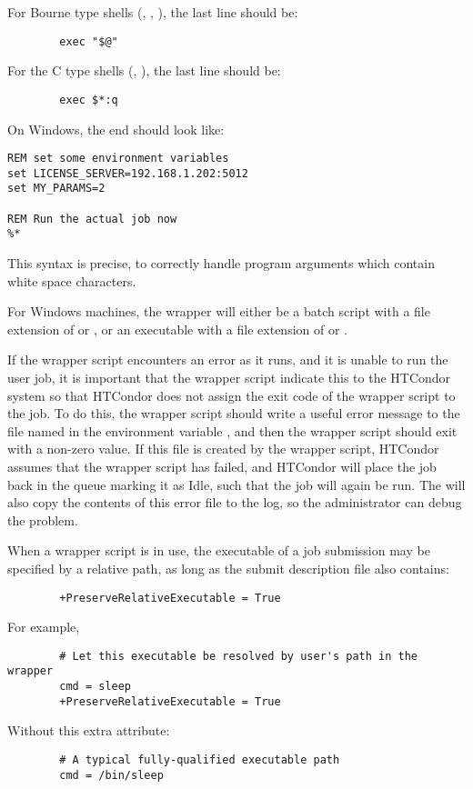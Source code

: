 \begin{description}
  For Bourne type shells (, , ), 
  the last line should be:
\begin{verbatim}
        exec "$@"
\end{verbatim}
  For the C type shells (, ), the last line should be:
\begin{verbatim}
        exec $*:q
\end{verbatim}

  On Windows, the end should look like:
\begin{verbatim}
REM set some environment variables
set LICENSE_SERVER=192.168.1.202:5012
set MY_PARAMS=2

REM Run the actual job now
%*

\end{verbatim}

  This syntax is precise, to correctly handle program arguments
  which contain white space characters.

  For Windows machines, the wrapper will either be
  a batch script with a file extension of  or ,
  or an executable with a file extension of  or .

  If the wrapper script encounters an error as it runs,
  and it is unable to run the user job, 
  it is important that the wrapper script indicate this to the HTCondor system
  so that HTCondor does not assign the exit code of the wrapper script to the
  job.  
  To do this, the wrapper script should write a useful error message
  to the file named in the environment variable 
  ,
  and then the wrapper script should exit with a non-zero value.
  If this file is created by the wrapper script, 
  HTCondor assumes that the wrapper script has failed, 
  and HTCondor will place the job back in the queue marking it as Idle, 
  such that the job will again be run.
  The  will also copy the contents of this error file to
  the  log, so the administrator can debug the problem.

  When a wrapper script is in use, the executable of a job submission may be
  specified by a relative path, as long as the submit description file
  also contains:
\begin{verbatim}
        +PreserveRelativeExecutable = True
\end{verbatim}
  For example,
\begin{verbatim}
        # Let this executable be resolved by user's path in the wrapper
        cmd = sleep
        +PreserveRelativeExecutable = True
\end{verbatim}
  Without this extra attribute:
\begin{verbatim}
        # A typical fully-qualified executable path
        cmd = /bin/sleep
\end{verbatim}


\end{description}
